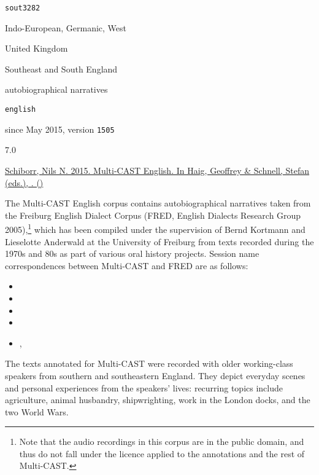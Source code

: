 \begin{description}[labelwidth=6.5em,itemindent=0em,itemsep=0.25mm]
	\TabPositions{2em}
	\raggedright\small
	\item[glottocode]		\texttt{sout3282}
	\item[affiliation]		Indo-European, Germanic, West
	\item[area spoken]		United Kingdom
	\item[varieties rec'd]	Southeast and South England
	\item[text types]		autobiographical narratives
	\item[sources]		
	\medskip
	\item[identifier]		\texttt{english}
	\item[availability]		since May 2015, version \texttt{1505}
	\item[GRAID]		7.0		
	\item[RefIND]		\checksome{}	
	\item[ISNRef]		\checksome{}	
	\item[citation]		\hyperref[ssec:references-mc]{Schiborr, Nils N. 2015. Multi-CAST English. In Haig, Geoffrey \& Schnell, Stefan (eds.), . ()} \nocite{Schiborr2015}
\end{description}

\noindent The Multi-CAST English corpus contains autobiographical narratives taken from the Freiburg English Dialect Corpus (FRED, English Dialects Research Group 2005),\footnote{Note that the audio recordings in this corpus are in the public domain, and thus do not fall under the  licence applied to the annotations and the rest of Multi-CAST.} which has been compiled under the supervision of Bernd Kortmann and Lieselotte Anderwald at the University of Freiburg from texts recorded during the 1970s and 80s as part of various oral history projects. Session name correspondences between Multi-CAST and FRED are as follows:
%
\begin{itemize}
	\TabPositions{5em}
	\item	{}	\tab	{}
	\item	{}		\tab	{}
	\item	{}		\tab	{}
	\item	{}		\tab	{}
	\item	{}	\tab	{}, 
\end{itemize}
%
The texts annotated for Multi-CAST were recorded with older working-class speakers from southern and southeastern England. They depict everyday scenes and personal experiences from the speakers' lives: recurring topics include agriculture, animal husbandry, shipwrighting, work in the London docks, and the two World Wars.


